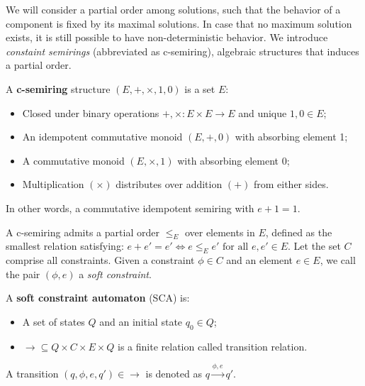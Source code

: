 We will consider a partial order among solutions,
such that the behavior of a component is fixed by its maximal solutions.
In case that no maximum solution exists,
it is still possible to have non-deterministic behavior.
We introduce \emph{constaint semirings} (abbreviated as c-semiring),
algebraic structures that induces a partial order.


\begin{definition} A \textbf{c-semiring} structure $(E,+,\times,1,0)$ is a set $E$:
	\begin{itemize}
		\item Closed under binary operations $+,\times:E\times E\to E$ and unique $1,0\in E$;
		\item An idempotent commutative monoid $(E,+,0)$ with absorbing element 1;
		\item A commutative monoid $(E,\times,1)$ with absorbing element 0;
		\item Multiplication $(\times)$ distributes over addition $(+)$ from either sides.
	\end{itemize} 
	In other words, a commutative idempotent semiring with $e+1=1$.
\end{definition}


A c-semiring admits a partial order $\leq_{E}$ over elements in $E$, defined as the smallest relation satisfying: $ e+e' = e' \Leftrightarrow e \leq_{E} e' \text{ for all } e,e' \in E $.
Let the set $C$ comprise all constraints. Given a constraint $\phi\in C$ and an element $e\in E$, we call the pair $(\phi,e)$ a \emph{soft constraint}.

\begin{definition}
	A \textbf{soft constraint automaton} (SCA) is: 
	\begin{itemize}
		\item A set of states $Q$ and an initial state $q_0\in Q$;
		\item ${\rightarrow} \subseteq Q \times C \times E \times Q$ is a finite relation called transition relation. 
	\end{itemize}
\end{definition}
A transition $(q,\phi,e,q') \in{\rightarrow}$ is denoted as $q \xrightarrow{\phi,e} q'$.


